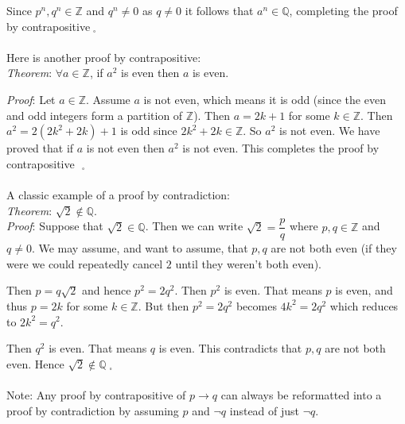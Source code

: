 \documentclass[12pt]{amsart}
\theoremstyle{definition}
\theoremstyle{remark}
\newcommand{\ints}{\mathbb Z}
\newcommand{\rats}{\mathbb Q}
\begin{document}
\medskip

Since $p^{n},q^{n}\in\ints$ and $q^{n}\neq 0$ as $q\neq 0$ it follows that $a^{n}\in\rats$, completing the proof by contrapositive$\;_{\square}$\\ \\

Here is another proof by contrapositive:\\


\emph{Theorem}:  $\forall a\in\ints$, if $a^{2}$ is even then $a$ is even.


\bigskip

\emph{Proof}:  Let $a\in\ints$.  Assume $a$ is not even, which  means it is odd (since the even and odd integers form a partition of $\ints$).  Then $a=2k+1$ for some $k\in\ints$.  Then $a^{2}=2(2k^{2}+2k)+1$ is odd since $2k^{2}+2k\in\ints$.  So $a^{2}$ is not even.  We have proved that if $a$ is not even then $a^{2}$ is not even.  This completes the proof by contrapositive$\mbox{ }_{\square}$ \\ \\

A classic example of a proof by contradiction:\\


\emph{Theorem}:  $\sqrt{2}\not\in\rats$.\\


\emph{Proof}:  Suppose that $\sqrt{2}\in\rats$.  Then we can write $\sqrt{2}=\dfrac{p}{q}$ where $p,q\in\ints$ and $q\neq 0$.  We may assume, and want to assume, that $p,q$ are not both even (if they were we could repeatedly cancel $2$ until they weren't both even).

\medskip

Then $p=q\sqrt{2}$ and hence $p^{2}=2q^{2}$.  Then $p^{2}$ is even.  That means $p$ is even, and thus $p=2k$ for some $k\in\ints$.  But then $\displaystyle p^{2}=2q^{2}$ becomes $4k^{2}=2q^{2}$ which reduces to $2k^{2}=q^{2}$.

\bigskip

Then $q^{2}$ is even.  That means $q$ is even.  This contradicts that $p,q$ are not both even.  Hence $\sqrt{2}\not\in\rats\;_{\square}$\\ \\


Note:  Any proof by contrapositive of $p\rightarrow q$ can always be reformatted into a proof by contradiction by assuming $p$ and $\lnot q$ instead of just $\lnot q$.\\ \\
\end{document}
